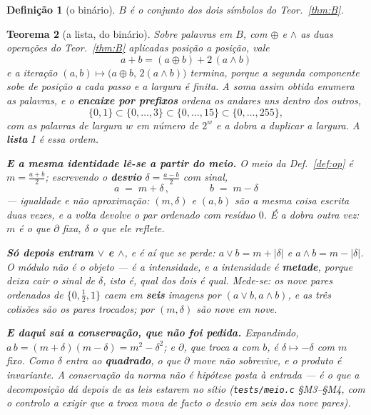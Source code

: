 \documentclass[11pt,a4paper]{article}
\newcommand{\code}[1]{\texttt{\small #1}}
\newtheorem{teorema}{Teorema}
\newtheorem{definicao}[teorema]{Definição}
\begin{document}
\begin{definicao}[o binário]\label{def:B}
$B$ é o conjunto dos dois símbolos do Teor.~\ref{thm:B}.
\end{definicao}

\begin{teorema}[a lista, do binário]\label{thm:BI}
Sobre palavras em $B$, com $\oplus$ e $\wedge$ as duas operações do
Teor.~\ref{thm:B} aplicadas posição a posição, vale
\[
\boxed{\;a+b=(a\oplus b)+2\,(a\wedge b)\;}
\]
e a iteração $(a,b)\mapsto\bigl(a\oplus b,\,2(a\wedge b)\bigr)$ termina, porque a
segunda componente sobe de posição a cada passo e a largura é finita. A soma
assim obtida enumera as palavras, e o \textbf{encaixe por prefixos} ordena os
andares uns dentro dos outros,
\[
\{0,1\}\subset\{0,\dots,3\}\subset\{0,\dots,15\}\subset\{0,\dots,255\},
\]
com as palavras de largura $w$ em número de $2^{w}$ e a dobra a duplicar a
largura. A \textbf{lista} $I$ é essa ordem.

\medskip\noindent\textbf{E a mesma identidade lê-se a partir do meio.} O meio
da Def.~\ref{def:op} é $m=\tfrac{a+b}{2}$; escrevendo o \textbf{desvio}
$\delta=\tfrac{a-b}{2}$ \emph{com sinal},
\[
\boxed{\;a \;=\; m+\delta\,,\qquad\qquad b \;=\; m-\delta\;}
\]
--- igualdade e não aproximação: $(m,\delta)$ e $(a,b)$ são a mesma coisa
escrita duas vezes, e a volta devolve o par \emph{ordenado} com resíduo $0$. É a
dobra outra vez: $m$ é o que $\partial$ fixa, $\delta$ o que ele reflete.

\medskip\noindent\textbf{Só depois entram $\vee$ e $\wedge$}, e é aí que se
perde: $a\vee b=m+|\delta|$ e $a\wedge b=m-|\delta|$. O módulo não é o objeto ---
é a \emph{intensidade}, e a intensidade é \textbf{metade}, porque deixa cair o
sinal de $\delta$, isto é, \emph{qual dos dois é qual}. Mede-se: os nove pares
ordenados de $\{0,\tfrac12,1\}$ caem em \textbf{seis} imagens por
$(a\vee b,a\wedge b)$, e as três colisões são os pares trocados; por
$(m,\delta)$ são nove em nove.

\medskip\noindent\textbf{E daqui sai a conservação, que não foi pedida.}
Expandindo, $a\,b=(m+\delta)(m-\delta)=m^{2}-\delta^{2}$; e $\partial$, que
troca $a$ com $b$, é $\delta\mapsto-\delta$ com $m$ fixo. Como $\delta$ entra ao
\textbf{quadrado}, o que $\partial$ move não sobrevive, e o produto é
\emph{invariante}. A conservação da norma não é hipótese posta à entrada --- é o
que a decomposição dá depois de as leis estarem no sítio
(\code{tests/meio.c} §M3--§M4, com o controlo a exigir que a troca mova de facto
o desvio em seis dos nove pares).
\end{teorema}
\end{document}
